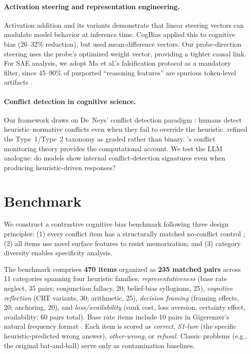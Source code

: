 \documentclass{article}
\begin{document}
\paragraph{Activation steering and representation engineering.}
Activation addition \citep{turner2023activation} and its variants
\citep{rimsky2024steering, li2024inference} demonstrate that linear
steering vectors can modulate model behavior at inference time.
CogBias \citep{huang2026cogbias} applied this to cognitive bias (26--32\%
reduction), but used mean-difference vectors.  Our probe-direction
steering uses the probe's optimized weight vector, providing a tighter
causal link.  For SAE analysis, we adopt Ma et al.'s falsification
protocol \citep{ma2026falsification} as a mandatory filter, since
45--90\% of purported ``reasoning features'' are spurious token-level
artifacts \citep{meloux2025dead}.

\paragraph{Conflict detection in cognitive science.}
Our framework draws on De~Neys' conflict detection paradigm
\citep{deneys2012bias, deneys2017dual}: humans detect heuristic--normative
conflicts even when they fail to override the heuristic.
\citet{evans2013dual} refined the Type~1/Type~2 taxonomy as graded rather
than binary.  \citet{botvinick2001conflict}'s conflict monitoring theory
provides the computational account.  We test the LLM analogue: do models
show internal conflict-detection signatures even when producing
heuristic-driven responses?


\section{Benchmark}
\label{sec:benchmark}

We construct a contrastive cognitive bias benchmark following three
design principles: (1) every conflict item has a structurally matched
no-conflict control \citep{deneys2012bias}; (2) all items use novel
surface features to resist memorization; and (3) category diversity
enables specificity analysis.

The benchmark comprises \textbf{470 items} organized as \textbf{235
matched pairs} across 11 categories spanning four heuristic families:
\emph{representativeness} (base rate neglect, 35 pairs; conjunction
fallacy, 20; belief-bias syllogisms, 25),
\emph{cognitive reflection} (CRT variants, 30; arithmetic, 25),
\emph{decision framing} (framing effects, 20; anchoring, 20), and
\emph{loss/availability} (sunk cost, loss aversion, certainty effect,
availability; 60 pairs total).  Base rate items include 10 pairs in
Gigerenzer's natural frequency format \citep{gigerenzer1995improve}.
Each item is scored as \emph{correct}, \emph{S1-lure} (the specific
heuristic-predicted wrong answer), \emph{other-wrong}, or \emph{refusal}.
Classic problems (e.g., the original bat-and-ball) serve only as
contamination baselines.
\end{document}
